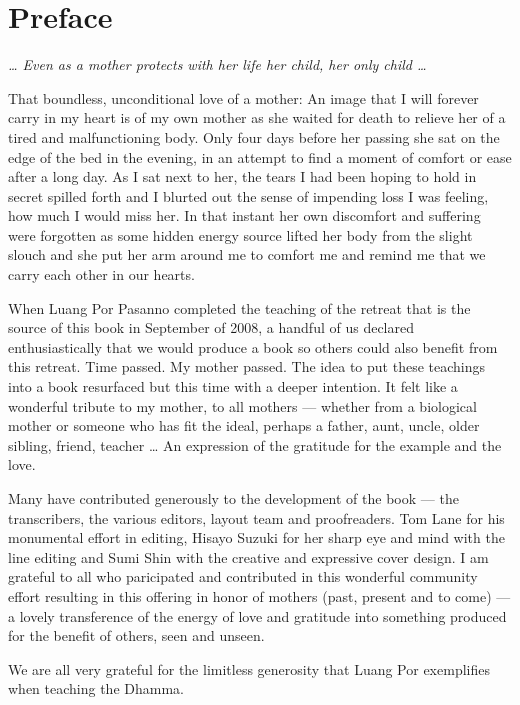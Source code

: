 \chapter{Preface}

{\center
\emph{\ldots{} Even as a mother protects with her life her child, her only
child \ldots{}}

}

\vspace{1em}
\noindent That boundless, unconditional love of a mother: An image that I will
forever carry in my heart is of my own mother as she waited for death to
relieve her of a tired and malfunctioning body. Only four days before
her passing she sat on the edge of the bed in the evening, in an attempt
to find a moment of comfort or ease after a long day. As I sat next to
her, the tears I had been hoping to hold in secret spilled forth and I
blurted out the sense of impending loss I was feeling, how much I would
miss her. In that instant her own discomfort and suffering were
forgotten as some hidden energy source lifted her body from the slight
slouch and she put her arm around me to comfort me and remind me that we
carry each other in our hearts.

When Luang Por Pasanno completed the teaching of the retreat that is the
source of this book in September of 2008, a handful of us declared
enthusiastically that we would produce a book so others could also
benefit from this retreat. Time passed. My mother passed. The idea to
put these teachings into a book resurfaced but this time with a deeper
intention. It felt like a wonderful tribute to my mother, to all mothers
— whether from a biological mother or someone who has fit the ideal,
perhaps a father, aunt, uncle, older sibling, friend, teacher \ldots{} An
expression of the gratitude for the example and the love.

Many have contributed generously to the development of the book — the
transcribers, the various editors, layout team and proofreaders. Tom
Lane for his monumental effort in editing, Hisayo Suzuki for her sharp
eye and mind with the line editing and Sumi Shin with the creative and
expressive cover design. I am grateful to all who paricipated and
contributed in this wonderful community effort resulting in this
offering in honor of mothers (past, present and to come) — a lovely
transference of the energy of love and gratitude into something produced
for the benefit of others, seen and unseen.

We are all very grateful for the limitless generosity that Luang Por
exemplifies when teaching the Dhamma.
